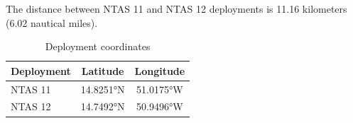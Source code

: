 
The distance between NTAS 11 and NTAS 12 deployments is 11.16 kilometers (6.02 nautical miles).

\begin{table}[ht]
\centering
\caption{Deployment coordinates}
\begin{tabular}{lcc}
\hline
\textbf{Deployment} & \textbf{Latitude} & \textbf{Longitude} \\
\hline
NTAS 11 & 14.8251°N & 51.0175°W \\
NTAS 12 & 14.7492°N & 50.9496°W \\
\hline
\end{tabular}
\end{table}
